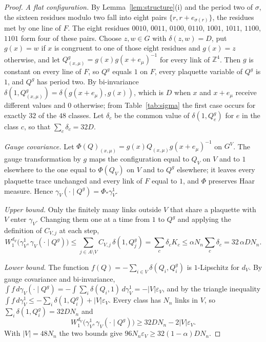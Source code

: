 \documentclass[11pt]{amsart}
\theoremstyle{definition}
\theoremstyle{remark}
\numberwithin{equation}{section}
\newcommand{\Z}{\mathbb{Z}}
\begin{document}
\begin{proof}
\emph{A flat configuration.} By Lemma~\ref{lem:structure}(i) and the period
two of $\sigma$, the sixteen residues modulo two fall into eight pairs
$\{r,r+e_{\sigma(r)}\}$, the residues met by one line of $F$. The eight
residues $0010$, $0011$, $0100$, $0110$, $1001$, $1011$, $1100$, $1101$ form
four of these pairs. Choose $z,w\in G$ with $\delta(z,w)=D$, put $g(x)=w$ if
$x$ is congruent to one of those eight residues and $g(x)=z$ otherwise, and
let $Q^g_{(x,\mu)}=g(x)g(x+e_\mu)^{-1}$ for every link of $\Z^4$. Then $g$ is
constant on every line of $F$, so $Q^g$ equals $1$ on $F$, every plaquette
variable of $Q^g$ is $1$, and $Q^g$ has period two. By bi-invariance
$\delta(1,Q^g_{(x,\mu)})=\delta(g(x+e_\mu),g(x))$, which is $D$ when $x$ and
$x+e_\mu$ receive different values and $0$ otherwise; from
Table~\ref{tab:sigma} the first case occurs for exactly $32$ of the $48$
classes. Let $\delta_c$ be the common value of $\delta(1,Q^g_e)$ for $e$ in
the class $c$, so that $\sum_c\delta_c=32D$.

\emph{Gauge covariance.} Let $\Phi(Q)_{(x,\mu)}=g(x)Q_{(x,\mu)}g(x+e_\mu)^{-1}$
on $G^V$. The gauge transformation by $g$ maps the configuration equal to
$Q_V$ on $V$ and to $1$ elsewhere to the one equal to $\Phi(Q_V)$ on $V$ and
to $Q^g$ elsewhere; it leaves every plaquette trace unchanged and every link
of $F$ equal to $1$, and $\Phi$ preserves Haar measure. Hence
$\gamma_V(\cdot\mid Q^g)=\Phi_*\gamma^1_V$.

\emph{Upper bound.} Only the finitely many links outside $V$ that share a
plaquette with $V$ enter $\gamma_V$. Changing them one at a time from $1$ to
$Q^g$ and applying the definition of $C_{V,j}$ at each step,
\[
W_1^{d_V}\bigl(\gamma^1_V,\gamma_V(\cdot\mid Q^g)\bigr)\le\sum_{j\in
A\setminus V}C_{V,j}\,\delta(1,Q^g_j)=\sum_c\delta_cK_c\le\alpha N_n\sum_c
\delta_c=32\,\alpha DN_n .
\]

\emph{Lower bound.} The function $f(Q)=-\sum_{i\in V}\delta(Q_i,Q^g_i)$ is
$1$-Lipschitz for $d_V$. By gauge covariance and bi-invariance, $\int
f\,d\gamma_V(\cdot\mid Q^g)=-\int\sum_i\delta(Q_i,1)\,d\gamma^1_V=-|V|
\varepsilon_V$, and by the triangle inequality $\int f\,d\gamma^1_V\le
-\sum_i\delta(1,Q^g_i)+|V|\varepsilon_V$. Every class has $N_n$ links in $V$,
so $\sum_i\delta(1,Q^g_i)=32DN_n$ and
\[
W_1^{d_V}\bigl(\gamma^1_V,\gamma_V(\cdot\mid Q^g)\bigr)\ge32DN_n-2|V|
\varepsilon_V .
\]
With $|V|=48N_n$ the two bounds give $96N_n\varepsilon_V\ge32(1-\alpha)DN_n$.
\end{proof}
\end{document}
